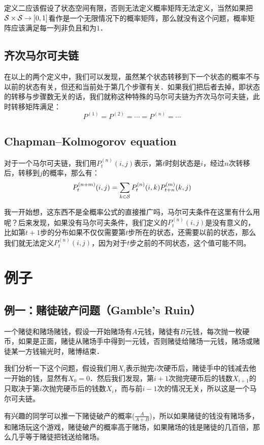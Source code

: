 		\remark 定义二应该假设了状态空间有限，否则无法定义概率矩阵无法定义，当然如果把${\cal S}\times {\cal S} \rightarrow [0,1]$看作是一个无限情况下的概率矩阵，那么就没有这个问题，概率矩阵应该满足每一列非负且和为$1$．
		
	\subsection{齐次马尔可夫链}
		在以上的两个定义中，我们可以发现，虽然某个状态转移到下一个状态的概率不与以前的状态有关，但还和当前处于第几个步骤有关．如果我们把后者去掉，即状态的转移与步骤数无关的话，我们就称这种特殊的马尔可夫链为齐次马尔可夫链，此时转移矩阵满足：
		$$
			P^{(1)} = P^{(2)} = \cdots = P^{(n)} = \cdots 
		$$
	\subsection{Chapman–Kolmogorov equation}
		对于一个马尔可夫链，我们用$P_{t}^{(n)}(i,j)$表示，第$t$时刻状态是$i$，经过$n$次转移后，转移到$j$的概率，那么有：
		$$
			P_{t}^{(n+m)}(i,j) = \sum_{k \in \cal S}P_{t}^{(n)}(i,k)P_{t+n}^{(m)}(k,j)
		$$
		
		\remark 我一开始想，这东西不是全概率公式的直接推广吗，马尔可夫条件在这里有什么用呢？后来发现，如果没有马尔可夫条件，我们定义的$P_{t}^{(n)}(i,j)$是没有意义的，比如第$t+1$步的分布如果不仅仅需要第$t$步所在的状态，还需要以前的状态，那么我们就无法定义$P_{t}^{(n)}(i,j)$，因为对于$t$步之前的不同状态，这个值可能不同。
		
\section{例子} 
		\subsection{例一：赌徒破产问题（Gamble's Ruin）}
		一个赌徒和赌场赌钱，假设一开始赌场有$A$元钱，赌徒有$B$元钱，每次抛一枚硬币，如果是正面，赌徒从赌场手中得到一元钱，否则赌徒给赌场一元钱，赌场或赌徒某一方钱输光时，赌博结束．
		
		我们分析一下这个问题，假设我们用$X_i$表示抛完$i$次硬币后，赌徒手中的钱减去他一开始的钱，显然有$X_0 = 0$．然后我们发现，第$i+1$次抛完硬币后的钱数$X_{i+1}$的只取决于第$i$次抛完硬币后的钱数$X_i$，而与前$i-1$次的情况无关，所以这是一个马尔可夫链。
		
		\remark 有兴趣的同学可以推一下赌徒破产的概率($\frac{A}{A+B}$)，所以如果赌徒的钱没有赌场多，和赌场玩这个游戏，赌徒破产的概率高于赌场，如果赌场的钱是赌徒的几百倍，那么几乎等于赌徒把钱送给赌场。
		
